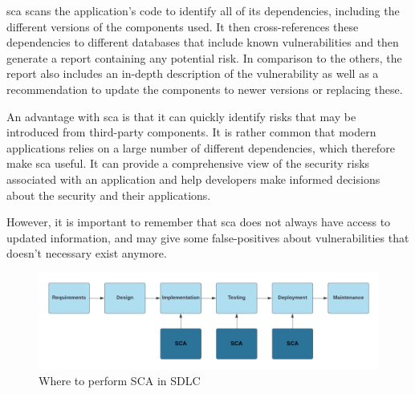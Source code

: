  \acrshort{sca} scans the application's code to identify all of its dependencies, including the different versions of the components used. It then cross-references these dependencies to different databases that include known vulnerabilities and then generate a report containing any potential risk. In comparison to the others, the report also includes an in-depth description of the vulnerability as well as a recommendation to update the components to newer versions or replacing these. 

An advantage with \acrshort{sca} is that it can quickly identify risks that may be introduced from third-party components. It is rather common that modern applications relies on a large number of  different dependencies, which therefore make \acrshort{sca} useful. It can provide a comprehensive view of the security risks associated with an application and help developers make informed decisions about the security and their applications. 

However, it is important to remember that \acrshort{sca} does not always have access to updated information, and may give some false-positives about vulnerabilities that doesn't necessary exist anymore. 


\begin{figure}[htp]
    \centering
    \includegraphics[width=1\columnwidth]{Images/SCA.png}
    \caption{Where to perform SCA in SDLC} 
    \label{fig:my_label}
\end{figure}

\newpage
